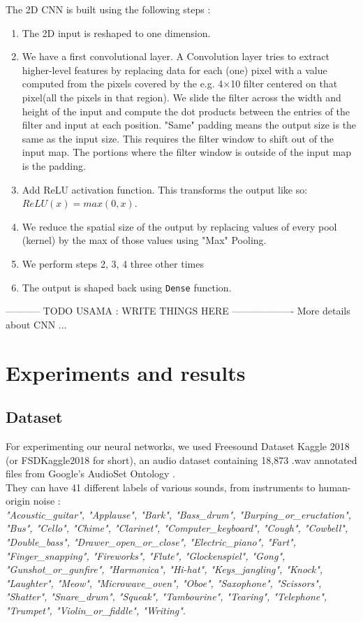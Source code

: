 \documentclass{article} %
\begin{document}
		The 2D CNN is built using the following steps :
		\begin{enumerate} 
			\item The 2D input is reshaped to one dimension.
			\item We have a first convolutional layer. A Convolution layer tries to extract higher-level features by replacing data for each (one) pixel with a value computed from the pixels covered by the e.g. 4×10 filter centered on that pixel(all the pixels in that region). We slide the filter across the width and height of the input and compute the dot products between the entries of the filter and input at each position. "Same" padding means the output size is the same as the input size. This requires the filter window to shift out of the input map. The portions where the filter window is outside of the input map is the padding.
			\item Add ReLU activation function. This transforms the output like so: $ReLU(x) = max(0,x)$.
			\item  We reduce the spatial size of the output by replacing values of every pool (kernel) by the max of those values using "Max" Pooling.
			\item We perform steps 2, 3, 4 three other times
			\item The output is shaped back using \verb+Dense+ function. 
		\end{enumerate}

		----------- TODO USAMA : WRITE THINGS HERE -------------------
		More details about CNN ...

\section{Experiments and results}
	\subsection{Dataset}
		For experimenting our neural networks, we used Freesound Dataset Kaggle 2018 (or FSDKaggle2018 for short), an audio dataset containing 18,873 .wav annotated files from Google's AudioSet Ontology \cite{audioset}.\\
		They can have 41 different labels of various sounds, from instruments to human-origin noise :\\
		\textit{"Acoustic\_guitar", "Applause", "Bark", "Bass\_drum", "Burping\_or\_eructation", "Bus", "Cello", "Chime", "Clarinet", "Computer\_keyboard", "Cough", "Cowbell", "Double\_bass", "Drawer\_open\_or\_close", "Electric\_piano", "Fart", "Finger\_snapping", "Fireworks", "Flute", "Glockenspiel", "Gong", "Gunshot\_or\_gunfire", "Harmonica", "Hi-hat", "Keys\_jangling", "Knock", "Laughter", "Meow", "Microwave\_oven", "Oboe", "Saxophone", "Scissors", "Shatter", "Snare\_drum", "Squeak", "Tambourine", "Tearing", "Telephone", "Trumpet", "Violin\_or\_fiddle", "Writing"}.\\
\end{document}
